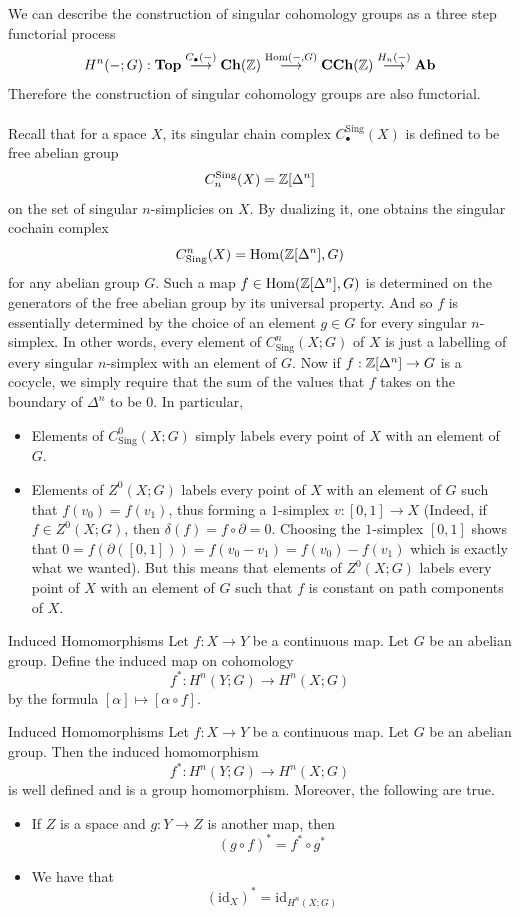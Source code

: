 \documentclass[a4paper]{article}
\begin{document}
We can describe the construction of singular cohomology groups as a three step functorial process $$H^n(-;G):\bold{Top}\overset{C_\bullet(-)}{\longrightarrow}\bold{Ch}(\mathbb{Z})\overset{\operatorname{Hom}(-,G)}{\longrightarrow}\bold{CCh}(\mathbb{Z})\overset{H_n(-)}{\longrightarrow}\bold{Ab}$$ Therefore the construction of singular cohomology groups are also functorial. \\~\\

Recall that for a space $X$, its singular chain complex $C_\bullet^\text{Sing}(X)$ is defined to be free abelian group $$C_n^\text{Sing}(X)=\mathbb{Z}[\Delta^n]$$ on the set of singular $n$-simplicies on $X$. By dualizing it, one obtains the singular cochain complex $$C_\text{Sing}^n(X)=\operatorname{Hom}(\mathbb{Z}[\Delta^n],G)$$ for any abelian group $G$. Such a map $f\in\operatorname{Hom}(\mathbb{Z}[\Delta^n],G)$ is determined on the generators of the free abelian group by its universal property. And so $f$ is essentially determined by the choice of an element $g\in G$ for every singular $n$-simplex. In other words, every element of $C_\text{Sing}^n(X;G)$ of $X$ is just a labelling of every singular $n$-simplex with an element of $G$. Now if $f:\mathbb{Z}[\Delta^n]\to G$ is a cocycle, we simply require that the sum of the values that $f$ takes on the boundary of $\Delta^n$ to be $0$. In particular, 
\begin{itemize}
\item Elements of $C_\text{Sing}^0(X;G)$ simply labels every point of $X$ with an element of $G$. 
\item Elements of $Z^0(X;G)$ labels every point of $X$ with an element of $G$ such that $f(v_0)=f(v_1)$, thus forming a $1$-simplex $v:[0,1]\to X$ (Indeed, if $f\in Z^0(X;G)$, then $\delta(f)=f\circ\partial=0$. Choosing the $1$-simplex $[0,1]$ shows that $0=f(\partial([0,1]))=f(v_0-v_1)=f(v_0)-f(v_1)$ which is exactly what we wanted). But this means that elements of $Z^0(X;G)$ labels every point of $X$ with an element of $G$ such that $f$ is constant on path components of $X$. 
\end{itemize}

\begin{defn}{Induced Homomorphisms}{} Let $f:X\to Y$ be a continuous map. Let $G$ be an abelian group. Define the induced map on cohomology $$f^\ast:H^n(Y;G)\to H^n(X;G)$$ by the formula $[\alpha]\mapsto[\alpha\circ f]$. 
\end{defn}

\begin{thm}{Induced Homomorphisms}{} Let $f:X\to Y$ be a continuous map. Let $G$ be an abelian group. Then the induced homomorphism $$f^\ast:H^n(Y;G)\to H^n(X;G)$$ is well defined and is a group homomorphism. Moreover, the following are true. 
\begin{itemize}
\item If $Z$ is a space and $g:Y\to Z$ is another map, then $$(g\circ f)^\ast=f^\ast\circ g^\ast$$
\item We have that $$(\text{id}_X)^\ast=\text{id}_{H^n(X;G)}$$
\end{itemize}
\end{thm}
\end{document}

